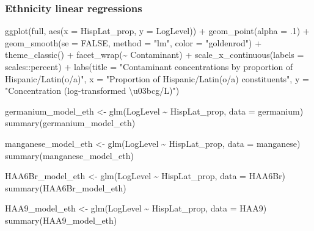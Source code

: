\documentclass[
  letterpaper,
  DIV=11,
  numbers=noendperiod]{scrartcl}
\newenvironment{Shaded}{\begin{snugshade}}{\end{snugshade}}
\newcommand{\AttributeTok}[1]{\textcolor[rgb]{0.40,0.45,0.13}{#1}}
\newcommand{\ConstantTok}[1]{\textcolor[rgb]{0.56,0.35,0.01}{#1}}
\newcommand{\DecValTok}[1]{\textcolor[rgb]{0.68,0.00,0.00}{#1}}
\newcommand{\FunctionTok}[1]{\textcolor[rgb]{0.28,0.35,0.67}{#1}}
\newcommand{\NormalTok}[1]{\textcolor[rgb]{0.00,0.23,0.31}{#1}}
\newcommand{\OtherTok}[1]{\textcolor[rgb]{0.00,0.23,0.31}{#1}}
\newcommand{\SpecialCharTok}[1]{\textcolor[rgb]{0.37,0.37,0.37}{#1}}
\newcommand{\StringTok}[1]{\textcolor[rgb]{0.13,0.47,0.30}{#1}}
\begin{document}
\hypertarget{ethnicity-linear-regressions}{%
\subsubsection{Ethnicity linear
regressions}\label{ethnicity-linear-regressions}}

\begin{Shaded}
\begin{Highlighting}[]
\FunctionTok{ggplot}\NormalTok{(full, }\FunctionTok{aes}\NormalTok{(}\AttributeTok{x =}\NormalTok{ HispLat\_prop, }\AttributeTok{y =}\NormalTok{ LogLevel)) }\SpecialCharTok{+}
  \FunctionTok{geom\_point}\NormalTok{(}\AttributeTok{alpha =}\NormalTok{ .}\DecValTok{1}\NormalTok{) }\SpecialCharTok{+}
  \FunctionTok{geom\_smooth}\NormalTok{(}\AttributeTok{se =} \ConstantTok{FALSE}\NormalTok{, }\AttributeTok{method =} \StringTok{"lm"}\NormalTok{, }\AttributeTok{color =} \StringTok{"goldenrod"}\NormalTok{) }\SpecialCharTok{+}
  \FunctionTok{theme\_classic}\NormalTok{() }\SpecialCharTok{+}
  \FunctionTok{facet\_wrap}\NormalTok{(}\SpecialCharTok{\textasciitilde{}}\NormalTok{ Contaminant) }\SpecialCharTok{+}
  \FunctionTok{scale\_x\_continuous}\NormalTok{(}\AttributeTok{labels =}\NormalTok{ scales}\SpecialCharTok{::}\NormalTok{percent) }\SpecialCharTok{+}
  \FunctionTok{labs}\NormalTok{(}\AttributeTok{title =} \StringTok{"Contaminant concentrations by proportion of Hispanic/Latin(o/a)"}\NormalTok{,}
       \AttributeTok{x =} \StringTok{"Proportion of Hispanic/Latin(o/a) constituents"}\NormalTok{,}
       \AttributeTok{y =} \StringTok{"Concentration (log{-}transformed \textbackslash{}u03bcg/L)"}\NormalTok{)}

\NormalTok{germanium\_model\_eth }\OtherTok{\textless{}{-}} \FunctionTok{glm}\NormalTok{(LogLevel }\SpecialCharTok{\textasciitilde{}}\NormalTok{ HispLat\_prop, }\AttributeTok{data =}\NormalTok{ germanium)}
\FunctionTok{summary}\NormalTok{(germanium\_model\_eth)}

\NormalTok{manganese\_model\_eth }\OtherTok{\textless{}{-}} \FunctionTok{glm}\NormalTok{(LogLevel }\SpecialCharTok{\textasciitilde{}}\NormalTok{ HispLat\_prop, }\AttributeTok{data =}\NormalTok{ manganese)}
\FunctionTok{summary}\NormalTok{(manganese\_model\_eth)}

\NormalTok{HAA6Br\_model\_eth }\OtherTok{\textless{}{-}} \FunctionTok{glm}\NormalTok{(LogLevel }\SpecialCharTok{\textasciitilde{}}\NormalTok{ HispLat\_prop, }\AttributeTok{data =}\NormalTok{ HAA6Br)}
\FunctionTok{summary}\NormalTok{(HAA6Br\_model\_eth)}

\NormalTok{HAA9\_model\_eth }\OtherTok{\textless{}{-}} \FunctionTok{glm}\NormalTok{(LogLevel }\SpecialCharTok{\textasciitilde{}}\NormalTok{ HispLat\_prop, }\AttributeTok{data =}\NormalTok{ HAA9)}
\FunctionTok{summary}\NormalTok{(HAA9\_model\_eth)}
\end{Highlighting}
\end{Shaded}
\end{document}
